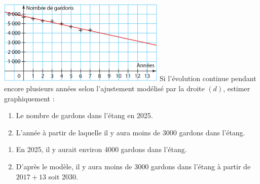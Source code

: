 \documentclass[a4paper,11pt,exos]{nsi} %
\begin{document}
{\includegraphics[width=8cm]{Ex17Sesamath.png}}
Si l'évolution continue pendant encore plusieurs années selon l'ajustement modélisé par la droite $(d)$, estimer graphiquement :
    \begin{enumerate}
        \item Le nombre de gardons dans l'étang en 2025.
        \item L'année à partir de laquelle il y aura moins de 3000 gardons dans l'étang.
    \end{enumerate}

\textcolor{UGLiBlue}{
    \begin{enumerate}
        \item En 2025, il y aurait environ 4000 gardons dans l'étang.
        \item D'après le modèle, il y aura moins de 3000 gardons dans l'étang à partir de $2017+13$ soit 2030.
    \end{enumerate}
}
\end{document}
